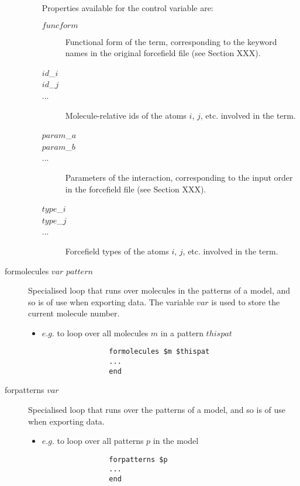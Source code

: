 \begin{description}
\begin{itemize}
			Properties available for the control variable are:
			\begin{description}
				\item[$funcform$\its]
					Functional form of the term, corresponding to the keyword names in the original forcefield file (see Section XXX).
				\item[$id$\_$i$]
				\item[$id$\_$j$]
				\item[...\its]
					Molecule-relative ids of the atoms $i$, $j$, etc. involved in the term.
				\item[$param$\_$a$]
				\item[$param$\_$b$]
				\item[...\its]
					Parameters of the interaction, corresponding to the input order in the forcefield file (see Section XXX).
				\item[$type$\_$i$]
				\item[$type$\_$j$]
				\item[...\its]
					Forcefield types of the atoms $i$, $j$, etc. involved in the term.
			\end{description}
		\end{itemize}

	\item[formolecules $var$ $pattern$\its]
		Specialised loop that runs over molecules in the patterns of a model, and so is of use when exporting data. The variable $var$ is used to store the current molecule number.
		\begin{itemize}
			\item $e.g.$ to loop over all molecules $m$ in a pattern $thispat$
			\begin{verbatim}
				formolecules $m $thispat
				...
				end
			\end{verbatim}
		\end{itemize}

	\item[forpatterns $var$\its]
		Specialised loop that runs over the patterns of a model, and so is of use when exporting data.
		\begin{itemize}
			\item $e.g.$ to loop over all patterns $p$ in the model
			\begin{verbatim}
				forpatterns $p
				...
				end
			\end{verbatim}


\end{itemize}
\end{description}
